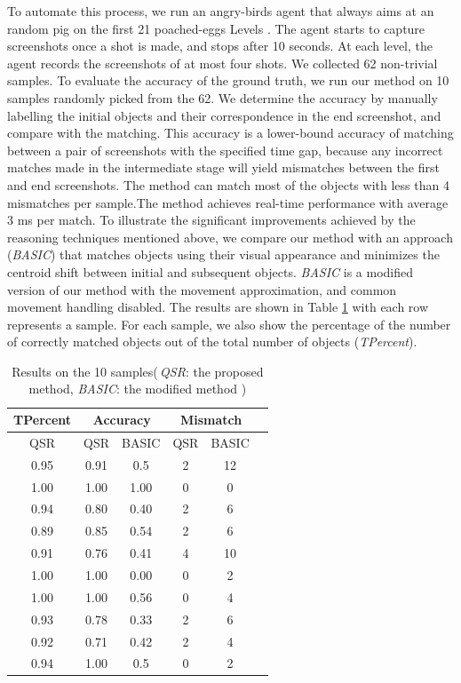 \documentclass[letterpaper]{article}
\begin{document}
To automate this process, we run an angry-birds agent that always aims at an random pig on the first 21 poached-eggs Levels \cite{abGame}. The agent starts to capture screenshots once a shot is made, and stops after 10 seconds. At each level, the agent records the screenshots of at most four shots. We collected 62 non-trivial samples. To evaluate the accuracy of the ground truth, we run our method on 10 samples randomly picked from the 62. We determine the accuracy by manually labelling the initial objects and their correspondence in the end screenshot, and compare with the matching. This accuracy is a lower-bound accuracy of matching between a pair of screenshots with the specified time gap, because any incorrect matches made in the intermediate stage will yield mismatches between the first and end screenshots.  
The method can match most of the objects with less than 4 mismatches per sample.The method achieves real-time performance with average 3 ms per match. To illustrate the significant improvements achieved by the reasoning techniques mentioned above, we compare our method with an approach (\emph{BASIC}) that matches objects using their visual appearance and minimizes the centroid shift between initial and subsequent objects. \emph{BASIC} is a modified version of our method with the movement approximation, and common movement handling disabled. The results are shown in Table \ref{empiResults} with each row represents a sample. For each sample, we also show the percentage of the number of correctly matched objects out of the total number of objects (\emph{TPercent}).

\vspace{-5mm}
\begin{table}[h!]
\caption{Results on the 10 samples(\,\emph{QSR}: the proposed method, \emph{BASIC}: the modified method )}\label{empiResults}
\centering
\begin{tabular}{c|c|c|c|c|c}
\hline
{TPercent} & \multicolumn{2}{c}{Accuracy} & \multicolumn{2}{c}{Mismatch}\\
\hline
QSR  & QSR & BASIC & QSR & BASIC\\
\hline
0.95& 0.91 & 0.5 & 2 & 12\\
1.00&1.00 & 1.00 & 0 & 0\\
0.94&0.80 & 0.40 & 2 & 6\\
0.89&0.85 & 0.54 & 2 & 6\\
0.91&0.76 & 0.41 & 4 & 10\\
1.00&1.00 & 0.00 & 0 & 2\\
1.00&1.00 & 0.56 & 0 & 4\\
0.93&0.78 & 0.33 & 2 & 6 \\
0.92&0.71 & 0.42 & 2 & 4\\
0.94&1.00 & 0.5 & 0 & 2\\
\hline
\end{tabular}
\end{table}
\vspace{-3mm}
\end{document}
